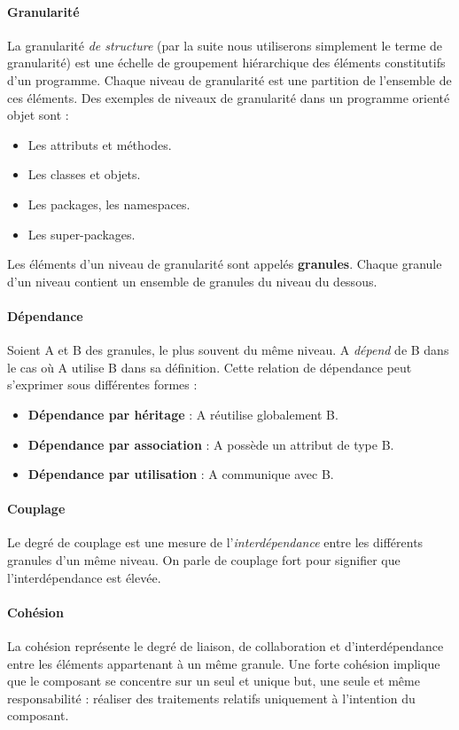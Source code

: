 \documentclass{scrartcl}
\begin{document}
    \paragraph{Granularité}La granularité \emph{de structure} (par la suite nous utiliserons simplement le terme de granularité) est une échelle de groupement hiérarchique des éléments constitutifs d'un programme. Chaque niveau de granularité est une partition de l'ensemble de ces éléments. Des exemples de niveaux de granularité dans un programme orienté objet sont :
    \begin{itemize}
        \item Les attributs et méthodes.
        \item Les classes et objets.
        \item Les packages, les namespaces.
        \item Les super-packages.
    \end{itemize}
    Les éléments d'un niveau de granularité sont appelés \textbf{granules}. Chaque granule d'un niveau contient un ensemble de granules du niveau du dessous.
    
    \paragraph{Dépendance}Soient A et B des granules, le plus souvent du même niveau. A \emph{dépend} de B dans le cas où A utilise B dans sa définition. Cette relation de dépendance peut s'exprimer sous différentes formes :
    \begin{itemize}
        \item \textbf{Dépendance par héritage} : A réutilise globalement B.
        \item \textbf{Dépendance par association} : A possède un attribut de type B.
        \item \textbf{Dépendance par utilisation} : A communique avec B.
    \end{itemize}

    \paragraph{Couplage}Le degré de couplage est une mesure de l'\emph{interdépendance} entre les différents granules d'un même niveau. On parle de couplage fort pour signifier que l'interdépendance est élevée.

    \paragraph{Cohésion}La cohésion représente le degré de liaison, de collaboration et d'interdépendance entre les éléments appartenant à un même granule. Une forte cohésion implique que le composant se concentre sur un seul et unique but, une seule et même responsabilité : réaliser des traitements relatifs uniquement à l’intention du composant.
    
\end{document}
